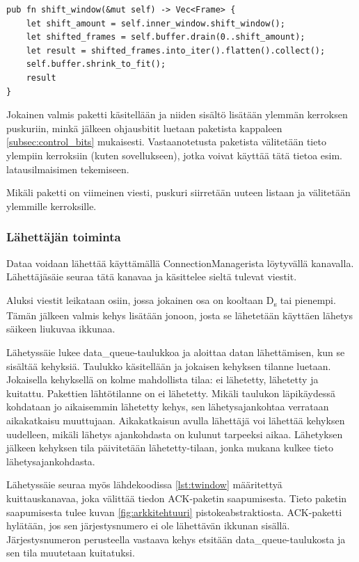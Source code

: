\documentclass[a4paper,12pt]{article}
\begin{document}
    \begin{lstlisting}[caption={Datan purkaminen puskurista}, label={lst:shift_rwindow}]
pub fn shift_window(&mut self) -> Vec<Frame> {
    let shift_amount = self.inner_window.shift_window();
    let shifted_frames = self.buffer.drain(0..shift_amount);
    let result = shifted_frames.into_iter().flatten().collect();
    self.buffer.shrink_to_fit();
    result
}\end{lstlisting}

    Jokainen valmis paketti käsitellään ja niiden sisältö lisätään ylemmän kerroksen puskuriin, minkä jälkeen ohjausbitit luetaan paketista kappaleen \ref{subsec:control_bits} mukaisesti. Vastaanotetusta paketista välitetään tieto ylempiin kerroksiin (kuten sovellukseen), jotka voivat käyttää tätä tietoa esim. latausilmaisimen tekemiseen. \par

    Mikäli paketti on viimeinen viesti, puskuri siirretään uuteen listaan ja välitetään ylemmille kerroksille.

    \subsubsection*{Lähettäjän toiminta}\label{subsec:sender_impl}
    Dataa voidaan lähettää käyttämällä ConnectionManagerista löytyvällä kanavalla. Lähettäjäsäie seuraa tätä kanavaa ja käsittelee sieltä tulevat viestit. \par

    Aluksi viestit leikataan osiin, jossa jokainen osa on kooltaan D\textsubscript{s} tai pienempi. Tämän jälkeen valmis kehys lisätään jonoon, josta se lähetetään käyttäen lähetys säikeen liukuvaa ikkunaa.
 
Lähetyssäie lukee data\_queue-taulukkoa ja aloittaa datan lähettämisen, kun se sisältää kehyksiä. Taulukko käsitellään ja jokaisen kehyksen tilanne luetaan. Jokaisella kehyksellä on kolme mahdollista tilaa: ei lähetetty, lähetetty ja kuitattu. Pakettien lähtötilanne on ei lähetetty. Mikäli taulukon läpikäydessä kohdataan jo aikaisemmin lähetetty kehys, sen lähetysajankohtaa verrataan aikakatkaisu muuttujaan. Aikakatkaisun avulla lähettäjä voi lähettää kehyksen uudelleen, mikäli lähetys ajankohdasta on kulunut tarpeeksi aikaa. Lähetyksen jälkeen kehyksen tila päivitetään lähetetty-tilaan, jonka mukana kulkee tieto lähetysajankohdasta. \par

Lähetyssäie seuraa myös lähdekoodissa \ref{lst:twindow} määritettyä kuittauskanavaa, joka välittää tiedon ACK-paketin saapumisesta. Tieto paketin saapumisesta tulee kuvan \ref{fig:arkkitehtuuri} pistokeabstraktiosta. ACK-paketti hylätään, jos sen järjestysnumero ei ole lähettävän ikkunan sisällä. Järjestysnumeron perusteella vastaava kehys etsitään data\_queue-taulukosta ja sen tila muutetaan kuitatuksi. \par
    
\end{document}
